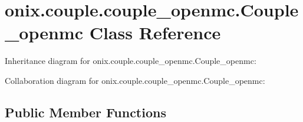 \hypertarget{classonix_1_1couple_1_1couple__openmc_1_1Couple__openmc}{}\section{onix.\+couple.\+couple\+\_\+openmc.\+Couple\+\_\+openmc Class Reference}
\label{classonix_1_1couple_1_1couple__openmc_1_1Couple__openmc}


Inheritance diagram for onix.\+couple.\+couple\+\_\+openmc.\+Couple\+\_\+openmc\+:


Collaboration diagram for onix.\+couple.\+couple\+\_\+openmc.\+Couple\+\_\+openmc\+:
\subsection*{Public Member Functions}
